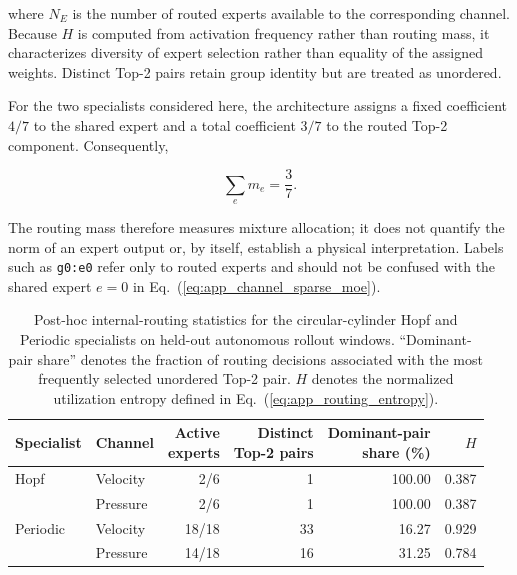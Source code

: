 \documentclass{article}
\def\plaineqref#1{\ref{#1}}
\begin{document}
where $N_E$ is the number of routed experts available to the corresponding channel. Because $H$ is computed from activation frequency rather than routing mass, it characterizes diversity of expert selection rather than equality of the assigned weights. Distinct Top-2 pairs retain group identity but are treated as unordered.

For the two specialists considered here, the architecture assigns a fixed coefficient $4/7$ to the shared expert and a total coefficient $3/7$ to the routed Top-2 component. Consequently,


\begin{equation}
  \sum_e m_e=\frac{3}{7}.
\end{equation}


The routing mass therefore measures mixture allocation; it does not quantify the norm of an expert output or, by itself, establish a physical interpretation.
Labels such as \texttt{g0:e0} refer only to routed experts and should not be confused with the shared expert $e=0$ in
Eq.~(\plaineqref{eq:app_channel_sparse_moe}).

\par


\begin{table}[H]
\centering
\caption{
Post-hoc internal-routing statistics for the circular-cylinder Hopf and Periodic specialists on held-out autonomous rollout windows. ``Dominant-pair share'' denotes the fraction of routing decisions associated with the most frequently selected unordered Top-2 pair. $H$ denotes the normalized utilization entropy defined in Eq.~(\plaineqref{eq:app_routing_entropy}).
}
\label{tab:internal_routing_summary}
\small
\setlength{\tabcolsep}{5pt}
\begin{tabular}{@{}llrrrr@{}}
\toprule
Specialist & Channel & \shortstack{Active\\experts} & \shortstack{Distinct\\Top-2 pairs} & \shortstack{Dominant-pair\\share (\%)} & $H$ \\
\midrule
Hopf & Velocity & 2/6 & 1 & 100.00 & 0.387 \\
     & Pressure & 2/6 & 1 & 100.00 & 0.387 \\
\addlinespace
Periodic & Velocity & 18/18 & 33 & 16.27 & 0.929 \\
         & Pressure & 14/18 & 16 & 31.25 & 0.784 \\
\bottomrule
\end{tabular}
\end{table}
\end{document}
